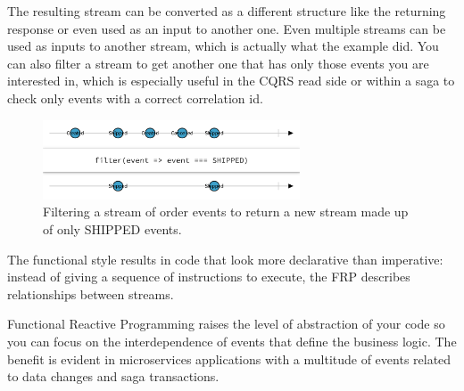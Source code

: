 \documentclass[conference]{IEEEtran}
\begin{document}
The resulting stream can be converted as a different structure like the returning response or even used as an input to another one. Even multiple streams can be used as inputs to another stream, which is actually what the example did. You can also filter a stream to get another one that has only those events you are interested in, which is especially useful in the CQRS read side or within a saga to check only events with a correct correlation id.

\begin{figure}[!htbp]
\centering
\includegraphics[width=3in]{jpeg/rx-filter}
\caption{Filtering a stream of order events to return a new stream made up of only SHIPPED events.}
\label{rx-filter}
\end{figure}

The functional style results in code that look more declarative than imperative: instead of giving a sequence of instructions to execute, the FRP describes relationships between streams.

Functional Reactive Programming raises the level of abstraction of your code so you can focus on the interdependence of events that define the business logic. The benefit is evident in microservices applications with a multitude of events related to data changes and saga transactions.

%
%
\end{document}
